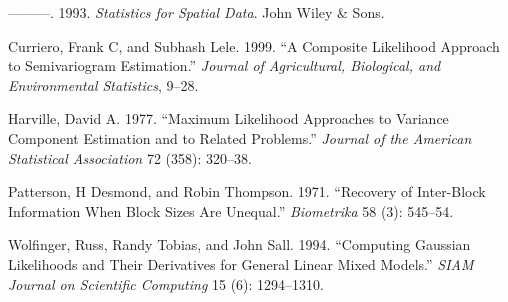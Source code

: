 \documentclass{article}
\begin{document}
\leavevmode\hypertarget{ref-cressie1993statistics}{}%
---------. 1993. \emph{Statistics for Spatial Data}. John Wiley \& Sons.

\leavevmode\hypertarget{ref-curriero1999composite}{}%
Curriero, Frank C, and Subhash Lele. 1999. ``A Composite Likelihood
Approach to Semivariogram Estimation.'' \emph{Journal of Agricultural,
Biological, and Environmental Statistics}, 9--28.

\leavevmode\hypertarget{ref-harville1977maximum}{}%
Harville, David A. 1977. ``Maximum Likelihood Approaches to Variance
Component Estimation and to Related Problems.'' \emph{Journal of the
American Statistical Association} 72 (358): 320--38.

\leavevmode\hypertarget{ref-patterson1971recovery}{}%
Patterson, H Desmond, and Robin Thompson. 1971. ``Recovery of
Inter-Block Information When Block Sizes Are Unequal.''
\emph{Biometrika} 58 (3): 545--54.

\leavevmode\hypertarget{ref-wolfinger1994computing}{}%
Wolfinger, Russ, Randy Tobias, and John Sall. 1994. ``Computing Gaussian
Likelihoods and Their Derivatives for General Linear Mixed Models.''
\emph{SIAM Journal on Scientific Computing} 15 (6): 1294--1310.



\end{document}
